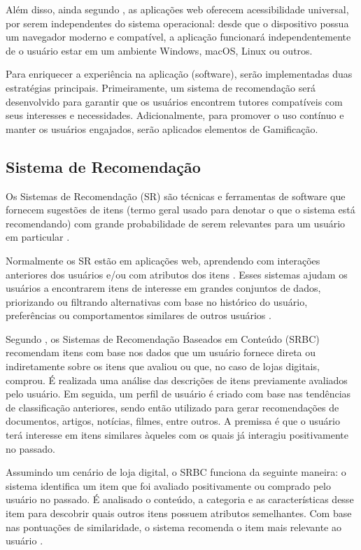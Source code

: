 Além disso, ainda segundo , as aplicações web oferecem acessibilidade universal, por serem independentes do sistema operacional: desde que o dispositivo possua um navegador moderno e compatível, a aplicação funcionará independentemente de o usuário estar em um ambiente Windows, macOS, Linux ou outros.

Para enriquecer a experiência na aplicação (software), serão implementadas duas estratégias principais. Primeiramente, um sistema de recomendação será desenvolvido para garantir que os usuários encontrem tutores compatíveis com seus interesses e necessidades. Adicionalmente, para promover o uso contínuo e manter os usuários engajados, serão aplicados elementos de Gamificação.

\subsection[Sistema de Recomendação]{Sistema de Recomendação}
\label{sec:recomendação}

Os Sistemas de Recomendação (SR) são técnicas e ferramentas de software que fornecem sugestões de itens (termo geral usado para denotar o que o sistema está recomendando) com grande probabilidade de serem relevantes para um usuário em particular \cite{springerSR2022}.

Normalmente os SR estão em aplicações web, aprendendo com interações anteriores dos usuários e/ou com atributos dos itens \cite{Aggarwal2016}. Esses sistemas ajudam os usuários a encontrarem itens de interesse em grandes conjuntos de dados, priorizando ou filtrando alternativas com base no histórico do usuário, preferências ou comportamentos similares de outros usuários \cite{springerSR2022}.

Segundo , os Sistemas de Recomendação Baseados em Conteúdo (SRBC) recomendam itens com base nos dados que um usuário fornece direta ou indiretamente sobre os itens que avaliou ou que, no caso de lojas digitais, comprou. É realizada uma análise das descrições de itens previamente avaliados pelo usuário. Em seguida, um perfil de usuário é criado com base nas tendências de classificação anteriores, sendo então utilizado para gerar recomendações de documentos, artigos, notícias, filmes, entre outros. A premissa é que o usuário terá interesse em itens similares àqueles com os quais já interagiu positivamente no passado.

Assumindo um cenário de loja digital, o SRBC funciona da seguinte maneira: o sistema identifica um item que foi avaliado positivamente ou comprado pelo usuário no passado. É analisado o conteúdo, a categoria e as características desse item para descobrir quais outros itens possuem atributos semelhantes. Com base nas pontuações de similaridade, o sistema recomenda o item mais relevante ao usuário \cite{patel2023recommendation}.

